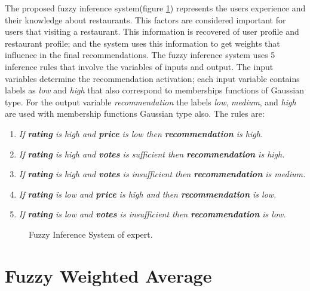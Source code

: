 The proposed fuzzy inference system(figure \ref{fig:expertfis})
represents the users experience and their knowledge about restaurants.
This factors are considered important for users that visiting a
restaurant. This information is recovered of user profile and
restaurant profile; and the system uses this information to get
weights that influence in the final recommendations. The fuzzy
inference system uses 5 inference rules that involve the variables of
inputs and output. The input variables determine the recommendation
activation; each input variable contains labels as \textit{low} and
\textit{high} that also correspond to memberships functions of
Gaussian type. For the output variable \textit{recommendation} the
labels \textit{low}, \textit{medium}, and \textit{high} are used with
membership functions Gaussian type also. The rules are:
\begin{enumerate} 
\item \textit{If \textbf{rating} is high and \textbf{price} is low then 
\textbf{recommendation} is high.}
\item \textit{If \textbf{rating} is high and \textbf{votes} is sufficient then 
\textbf{recommendation} is high.}
\item \textit{If \textbf{rating} is high and \textbf{votes} is insufficient then 
\textbf{recommendation} is medium.}
\item \textit{If \textbf{rating} is low and \textbf{price} is high and then 
\textbf{recommendation} is low.} 
\item \textit{If \textbf{rating} is low and \textbf{votes} is insufficient then 
\textbf{recommendation} is low.}
\end{enumerate} 
\begin{figure}
\captionsetup{justification=centering,margin=2cm,font=footnotesize}
\centering
{}
\caption{Fuzzy Inference System of expert.}
\label{fig:expertfis}      
\end{figure}

\section{Fuzzy Weighted Average} 


